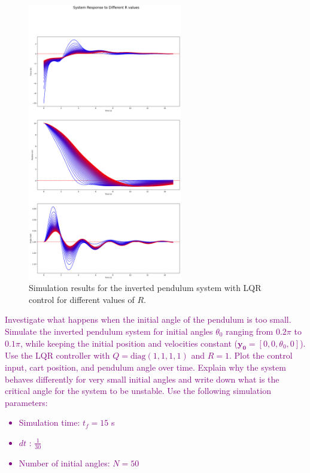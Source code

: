 \documentclass[a4 paper]{article}
\begin{document}
\begin{figure}[H]
    \centering
    \includegraphics[width=0.6\textwidth]{./figs/Different_R_values.png}
    \caption{Simulation results for the inverted pendulum system with LQR control for different values of \( R \).}
\end{figure}

    



\bigbreak

\textcolor{purple}{
 Investigate what happens when the initial angle of the pendulum is too small. 
Simulate the inverted pendulum system for initial angles \(\theta_0\) ranging from \( 0.2\pi \) to \( 0.1\pi \), 
while keeping the initial position and velocities constant (\(\mathbf{y_0} = [0, 0, \theta_0, 0]\)). 
Use the LQR controller with \( Q = \text{diag}(1,1,1,1) \) and \( R = 1 \). 
Plot the control input, cart position, and pendulum angle over time. 
Explain why the system behaves differently for very small initial angles and write down what is the critical angle for the system to be unstable.
Use the following simulation parameters:
\begin{itemize}
    \item Simulation time: \( t_f = 15 \) s
    \item $dt$ : \( \frac{1}{30} \)
    \item Number of initial angles: \( N = 50 \)
\end{itemize}
}
\end{document}
